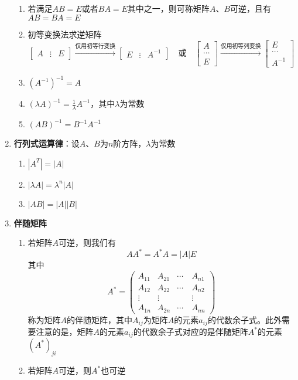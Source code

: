 \documentclass[12pt,a4paper,UTF8]{book}
\begin{document}
\begin{enumerate}
\begin{enumerate}
\item 若满足$AB=E$或者$BA=E$其中之一，则可称矩阵$A$、$B$可逆，且有$AB=BA=E$
\item 初等变换法求逆矩阵
\[\begin{bmatrix}A&\vdots&E\end{bmatrix}\xrightarrow{\text{仅用初等行变换}}\begin{bmatrix}E&\vdots&A^{-1}\end{bmatrix}\quad\text{或}\quad\begin{bmatrix}A\\\cdots\\E\end{bmatrix}\xrightarrow{\text{仅用初等列变换}}\begin{bmatrix}E\\\cdots\\A^{-1}\end{bmatrix}\]
\item $\left(A^{-1}\right)^{-1}=A$
\item $\left(\lambda A\right)^{-1}=\frac{1}{\lambda}A^{-1}$，其中$\lambda$为常数
\item $\left(AB\right)^{-1}=B^{-1}A^{-1}$
\end{enumerate}
\item \textbf{行列式运算律}：设$A$、$B$为$n$阶方阵，$\lambda$为常数
\begin{enumerate}
\item $\left|A^T\right|=\left|A\right|$
\item $\left|\lambda A\right|=\lambda^n\left|A\right|$
\item $\left|AB\right|=\left|A\right|\left|B\right|$
\end{enumerate}
\item \textbf{伴随矩阵}
\begin{enumerate}
\item 若矩阵$A$可逆，则我们有
\[AA^*=A^*A=\left|A\right|E\]
其中
\[A^*=\begin{pmatrix}A_{11}&A_{21}&\cdots&A_{n1}\\A_{12}&A_{22}&\cdots&A_{n2}\\\vdots&\vdots&\quad&\vdots\\A_{1n}&A_{2n}&\cdots&A_{nn}\end{pmatrix}\]
称为矩阵$A$的伴随矩阵，其中$A_{ij}$为矩阵$A$的元素$a_{ij}$的代数余子式。此外需要注意的是，矩阵$A$的元素$a_{ij}$的代数余子式对应的是伴随矩阵$A^*$的元素$\left(A^*\right)_{ji}$
\item 若矩阵$A$可逆，则$A^*$也可逆

\end{enumerate}
\end{enumerate}
\end{document}

